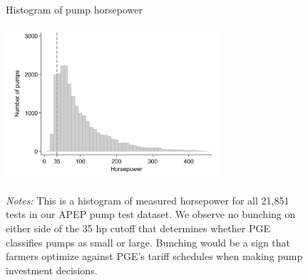 \begin{figure}[t]
\begin{centering}
\caption{Histogram of pump horsepower}
\label{fig:pump_hist}
\includegraphics[width=0.7\textwidth]{Figures/pump_hist.png}
\caption*{\scriptsize \emph{Notes:} This is a histogram of measured horsepower for all 21,851 tests in our APEP pump test dataset. We observe no bunching on either side of the 35 hp cutoff that determines whether PGE classifies pumps as small or large. Bunching would be a sign that farmers optimize against PGE's tariff schedules when making pump investment decisions.}
\end{centering}
\end{figure}
